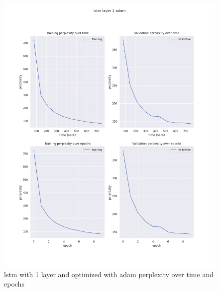 \documentclass[12pt]{article}
\theoremstyle{definition}
\begin{document}
\begin{figure}[H]
     \centering
     \includegraphics[scale=0.4]{lstm_layer_1_adam.png}
     \caption{lstm with 1 layer and optimized with adam perplexity over time and epochs}
\end{figure}
\end{document}
